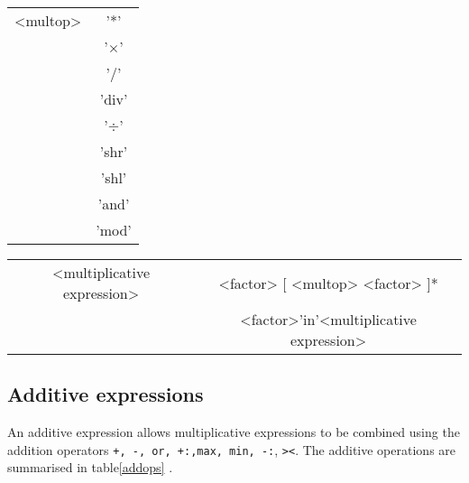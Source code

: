 {\vspace{0.3cm}
{\centering \begin{tabular}{|c|c|}
\hline 
<multop>&
'{*}'\\
&'{$\times$}'\\
&
'/'\\
&
'div'\\
&
'$\div$'\\
&
'shr'\\
&
'shl'\\
&
'and'\\
&
'mod'\\
\hline 
\end{tabular}\par}
\vspace{0.3cm}

\vspace{0.3cm}
{\centering \begin{tabular}{|c|c|}
\hline 
<multiplicative expression>&
<factor> {[} <multop> <factor> {]}{*}\\
&
<factor>'in'<multiplicative expression>\\
\hline 
\end{tabular}\par}
\vspace{0.3cm}


\subsection{Additive expressions}

An additive expression allows multiplicative expressions to be combined using
the addition operators \texttt{+\index{+}, -\index{-}, or, +:\index{+:},max,
min, -:}\index{-:}, 
\verb+><+\index{\verb+><+}. The additive operations are summarised in table\ref{addops}
.


\begin{table}


\end{table}}
